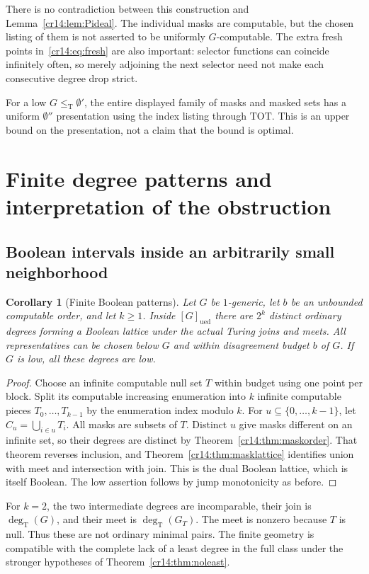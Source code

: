 \documentclass[11pt,a4paper]{article}
\newcommand{\leT}{\leq_{\mathrm T}}
\newcommand{\degT}{\operatorname{deg}_{\mathrm T}}
\newcommand{\ued}{\mathrm{ued}}
\newcommand{\jumpzero}{\emptyset'}
\newcommand{\doublezero}{\emptyset''}
\newtheorem{corollary}[theorem]{Corollary}
\theoremstyle{definition}
\theoremstyle{remark}
\begin{document}
There is no contradiction between this construction and
Lemma~\ref{cr14:lem:Pideal}. The individual masks are computable, but the
chosen listing of them is not asserted to be uniformly $G$-computable.
The extra fresh points in~\eqref{cr14:eq:fresh} are also important: selector
functions can coincide infinitely often, so merely adjoining the next
selector need not make each consecutive degree drop strict.

For a low $G\leT\jumpzero$, the entire displayed family of masks and
masked sets has a uniform $\doublezero$ presentation using the index
listing through $\mathrm{TOT}$. This is an upper bound on the presentation,
not a claim that the bound is optimal.

\section{Finite degree patterns and interpretation of the obstruction}
\label{cr14:sec:interpretation}
\subsection{Boolean intervals inside an arbitrarily small neighborhood}
\begin{corollary}[Finite Boolean patterns]\label{cr14:cor:boolean}
Let $G$ be $1$-generic, let $b$ be an unbounded computable order, and let
$k\geq1$. Inside $[G]_{\ued}$ there are $2^k$ distinct ordinary degrees
forming a Boolean lattice under the actual Turing joins and meets.
All representatives can be chosen below $G$ and within disagreement budget
$b$ of $G$. If $G$ is low, all these degrees are low.
\end{corollary}
\begin{proof}
Choose an infinite computable null set $T$ within budget using one point per
block. Split its computable increasing enumeration into $k$ infinite
computable pieces $T_0,\ldots,T_{k-1}$ by the enumeration index modulo $k$.
For $u\subseteq\{0,\ldots,k-1\}$, let $C_u=\bigcup_{i\in u}T_i$.
All masks are subsets of $T$. Distinct $u$ give masks different on an
infinite set, so their degrees are distinct by Theorem~\ref{cr14:thm:maskorder}.
That theorem reverses inclusion, and Theorem~\ref{cr14:thm:masklattice} identifies
union with meet and intersection with join. This is the dual Boolean
lattice, which is itself Boolean. The low assertion follows by jump
monotonicity as before.
\end{proof}

For $k=2$, the two intermediate degrees are incomparable, their join is
$\degT(G)$, and their meet is $\degT(G_T)$. The meet is nonzero because
$T$ is null. Thus these are not ordinary minimal pairs. The finite geometry
is compatible with the complete lack of a least degree in the full class
under the stronger hypotheses of Theorem~\ref{cr14:thm:noleast}.
\end{document}
